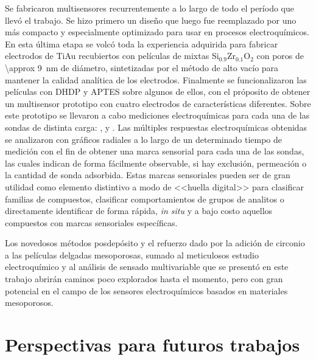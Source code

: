  Se fabricaron multisensores recurrentemente a lo largo de todo el período que llevó el trabajo. Se hizo primero un diseño que luego fue reemplazado por uno más compacto y especialmente optimizado para usar en procesos electroquímicos. En esta última etapa se volcó toda la experiencia adquirida para fabricar electrodos de Ti\textbar Au recubiertos con películas de mixtas Si$_{0.9}$Zr$_{0.1}$O$_2$ con poros de \SI{\approx 9}{\nm} de diámetro, sintetizadas por el método de alto vacío para mantener la calidad analítica de los electrodos. Finalmente se funcionalizaron las películas con DHDP y APTES sobre algunos de ellos, con el próposito de obtener un multisensor prototipo con cuatro electrodos de características diferentes. Sobre este prototipo se llevaron a cabo mediciones electroquímicas para cada una de las sondas de distinta carga: \ferroferri, \ferroceno\space y \aminorutenio. Las múltiples respuestas electroquímicas obtenidas se analizaron con gráficos radiales a lo largo de un determinado tiempo de medición con el fin de obtener una marca sensorial para cada una de las sondas, las cuales indican de forma fácilmente observable, si hay exclusión, permeación o la cantidad de sonda adsorbida. Estas marcas sensoriales pueden ser de gran utilidad como elemento distintivo a modo de <<huella digital>> para clasificar familias de compuestos, clasificar comportamientos de grupos de analitos o directamente identificar de forma rápida, \textit{in situ} y a bajo costo aquellos compuestos con marcas sensoriales específicas.

 Los novedosos métodos posdepósito y el refuerzo dado por la adición de circonio a las películas delgadas mesoporosas, sumado al meticulosos estudio electroquímico y al análisis de sensado multivariable que se presentó en este trabajo abrirán caminos poco explorados hasta el momento, pero con gran potencial en el campo de los sensores electroquímicos basados en materiales mesoporosos.

\section{Perspectivas para futuros trabajos}
 
